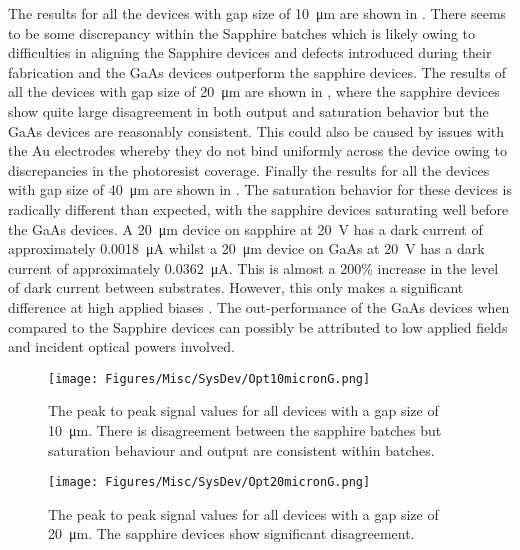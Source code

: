 The results for all the devices with gap size of \SI{10}{\micro\metre} are shown in . There seems to be some discrepancy within the Sapphire batches which is likely owing to difficulties in aligning the Sapphire devices and defects introduced during their fabrication and the GaAs devices outperform the sapphire devices. The results of all the devices with gap size of \SI{20}{\micro\metre} are shown in , where the sapphire devices show quite large disagreement in both output and saturation behavior but the GaAs devices are reasonably consistent. This could also be caused by issues with the Au electrodes whereby they do not bind uniformly across the device owing to discrepancies in the photoresist coverage. Finally the results for all the devices with gap size of \SI{40}{\micro\metre} are shown in . The saturation behavior for these devices is radically different than expected, with the sapphire devices saturating well before the GaAs devices. A \SI{20}{\micro\metre} device on sapphire at \SI{20}{V} has a dark current of approximately \SI{0.0018}{\micro\ampere} whilst a \SI{20}{\micro\metre} device on GaAs at \SI{20}{V} has a dark current of approximately \SI{0.0362}{\micro\ampere}. This is almost a 200\% increase in the level of dark current between substrates. However, this only makes a significant difference at high applied biases \DIFdelbegin \DIFdel{~}\DIFdelend \cite{Bacon2016}. The out\nobreakdash-performance of the GaAs devices when compared to the Sapphire devices can possibly be attributed to low applied fields and incident optical powers involved.

\begin{figure}[h!]
    \centering
    \texttt{[image: Figures/Misc/SysDev/Opt10micronG.png]}
    \captionsetup{font = footnotesize, justification = centering}
    \caption[The Peak to Peak Signal Values for all Devices with \SI{10}{\micro\metre} Gap]{The peak to peak signal values for all devices with a gap size of \SI{10}{\micro\metre}. There is disagreement between the sapphire batches but saturation behaviour and output are consistent within batches.}
    \label{fig:10micron}
\end{figure}

\begin{figure}[h!]
    \centering
    \texttt{[image: Figures/Misc/SysDev/Opt20micronG.png]}
    \captionsetup{font = footnotesize, justification = centering}
    \caption[The Peak to Peak Signal Values for all Devices with \SI{20}{\micro\metre} Gap]{The peak to peak signal values for all devices with a gap size of \SI{20}{\micro\metre}. The sapphire devices show significant disagreement.}
    \label{fig:20micron}
\end{figure}

